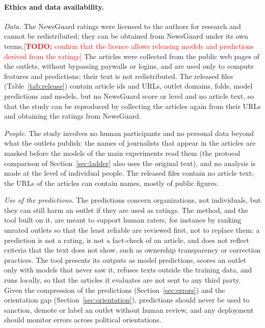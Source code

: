 \documentclass[11pt,a4paper]{article}
\newcommand{\todo}[1]{\textcolor{red}{[\textbf{TODO:} #1]}}
\begin{document}
\paragraph{Ethics and data availability.}
\emph{Data.} The NewsGuard ratings were licensed to the authors for research and cannot be redistributed; they can be obtained from
NewsGuard under its own terms.\todo{confirm that the licence allows releasing models and predictions derived from the
ratings} The articles were collected from the public web pages of the outlets,
without bypassing paywalls or logins, and are used only to compute features and predictions; their text is not
redistributed. The released files (Table~\ref{tab:release}) contain article ids and URLs, outlet domains, folds, model
predictions and models, but no NewsGuard score or level and no article text, so that the study can be reproduced by
collecting the articles again from their URLs and obtaining the ratings from NewsGuard.

\emph{People.} The study involves no human participants and no personal data beyond what the outlets publish: the names of journalists that appear in the articles are masked before the models of the main experiments read them
(the protocol comparison of Section~\ref{sec:ladder} also uses the original text), and no analysis is made at the level
of individual people. The released files contain no article text; the URLs of the articles can contain names, mostly
of public figures.

\emph{Use of the predictions.} The predictions concern organizations, not individuals, but they can still harm an outlet
if they are used as ratings. The method, and the tool built on it, are meant to support human raters, for instance by
ranking unrated outlets so that the least reliable are reviewed first, not to replace them: a prediction is not a
rating, is not a fact-check of an article, and does not reflect criteria that the text does not show, such as ownership
transparency or correction practices. The tool presents its outputs as model predictions, scores an outlet only with
models that never saw it, refuses texts outside the training data, and runs locally, so that the articles it evaluates
are not sent to any third party. Given the compression of the predictions (Section~\ref{sec:errors}) and the
orientation gap (Section~\ref{sec:orientation}), predictions should never be used to sanction, demote or label an outlet
without human review, and any deployment should monitor errors across political orientations.
\end{document}

